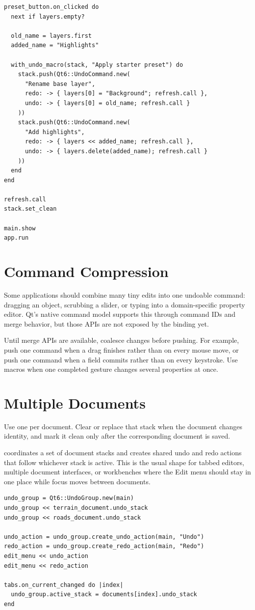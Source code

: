 \begin{lstlisting}[style=crystal]
preset_button.on_clicked do
  next if layers.empty?

  old_name = layers.first
  added_name = "Highlights"

  with_undo_macro(stack, "Apply starter preset") do
    stack.push(Qt6::UndoCommand.new(
      "Rename base layer",
      redo: -> { layers[0] = "Background"; refresh.call },
      undo: -> { layers[0] = old_name; refresh.call }
    ))
    stack.push(Qt6::UndoCommand.new(
      "Add highlights",
      redo: -> { layers << added_name; refresh.call },
      undo: -> { layers.delete(added_name); refresh.call }
    ))
  end
end

refresh.call
stack.set_clean

main.show
app.run
\end{lstlisting}

\section{Command Compression}

Some applications should combine many tiny edits into one undoable command: dragging an object, scrubbing a slider, or typing into a domain-specific property editor. Qt's native command model supports this through command IDs and merge behavior, but those APIs are not exposed by the binding yet.

Until merge APIs are available, coalesce changes before pushing. For example, push one command when a drag finishes rather than on every mouse move, or push one command when a field commits rather than on every keystroke. Use macros when one completed gesture changes several properties at once.

\section{Multiple Documents}

Use one  per document. Clear or replace that stack when the document changes identity, and mark it clean only after the corresponding document is saved.

 coordinates a set of document stacks and creates shared undo and redo actions that follow whichever stack is active. This is the usual shape for tabbed editors, multiple document interfaces, or workbenches where the Edit menu should stay in one place while focus moves between documents.

\begin{lstlisting}[style=crystal]
undo_group = Qt6::UndoGroup.new(main)
undo_group << terrain_document.undo_stack
undo_group << roads_document.undo_stack

undo_action = undo_group.create_undo_action(main, "Undo")
redo_action = undo_group.create_redo_action(main, "Redo")
edit_menu << undo_action
edit_menu << redo_action

tabs.on_current_changed do |index|
  undo_group.active_stack = documents[index].undo_stack
end
\end{lstlisting}

